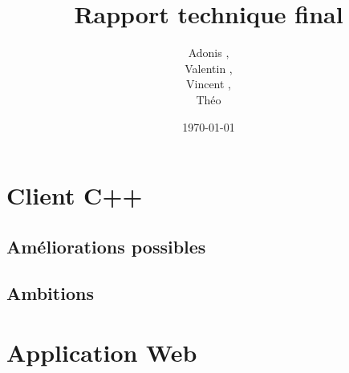 \documentclass[a4paper]{article}
\title{Rapport technique final}
\author{Adonis \bsc{Najimi},\\
 Valentin \bsc{Stern},\\
 Vincent \bsc{Albert},\\
 Théo \bsc{Gerriet}}
\date{\today}
\begin{document}
\maketitle
\newpage

\section{Client C++}
    \subsection{Améliorations possibles}
    

    \subsection{Ambitions}
    
\newpage
\section{Application Web}

\tableofcontents
\end{document}
